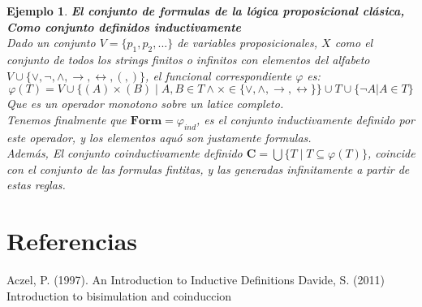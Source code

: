 \documentclass[executivepaper]{article}
\newtheorem{ejemplo}[propo]{Ejemplo}
\begin{document}
\begin{ejemplo}\textbf{El conjunto de formulas de la lógica proposicional clásica, Como conjunto definidos inductivamente}\\
    Dado un conjunto $V = \{p_1, p_2,...\}$ de variables proposicionales, $X$ como el conjunto de todos los strings finitos o infinitos con elementos del alfabeto $V\cup\{\lor, \lnot, \land, \rightarrow, \leftrightarrow, (, )\}$, el funcional correspondiente $\varphi$ es:
    $$\varphi(T) = V \cup \{(A) \times (B) \mid A , B\in T \land \times\in \{\lor, \land, \rightarrow, \leftrightarrow\}\}\cup T \cup \{\lnot A|A\in T\}$$
    Que es un operador monotono sobre un latice completo.\\
    Tenemos finalmente que $\mathbf{Form} = \varphi_{ind}$, es el conjunto inductivamente definido por este operador, y los elementos aquó son justamente formulas.\\    
    Además, El conjunto coinductivamente definido $\mathbf{{C}} = \bigcup \{T \mid T\subseteq\varphi(T)\}$, coincide con el conjunto de las formulas fintitas, y las generadas infinitamente a partir de estas reglas.
\end{ejemplo}



\newpage
\section{Referencias}
\begin{thebibliography}{9}
    Aczel, P. (1997). 
    An Introduction to Inductive Definitions
    Davide, S. (2011)
    Introduction to bisimulation and coinduccion
\end{thebibliography}
\end{document}
